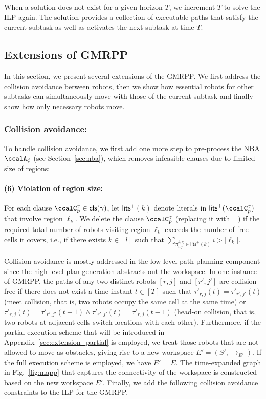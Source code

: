 \documentclass[Afour,sageh,times]{sagej}
\newcommand{\clause}[1]{\mathsf{cls}(#1)}
\newcommand{\cp}[2]{\ccalC_{#1}^{#2}}
\newcommand{\autop}{\ccalA_{\phi}}
\renewcommand{\ap}[3]{\mathcal{\pi}_{{#1},{#2}}^{#3}}
\begin{document}
{{When a solution does not exist for a given horizon $T$, we increment $T$ to solve the ILP again.  The solution provides  a collection of executable paths that satisfy  the current subtask   as well as activates the next subtask at time $T$.

\subsection{Extensions of GMRPP}\label{sec:extension_gmrpp}
In this section, we present several extensions of the GMRPP. We first address the collision avoidance between robots, then we  show  how essential robots for other subtasks can simultaneously move with those of the current subtask and finally show  how only necessary robots move.


\subsubsection{Collision avoidance:}\label{sec:extension_collision}
To handle collision avoidance, we first add one more step to  pre-process the NBA $\autop$ (see Section~\ref{sec:nba}), which removes infeasible clauses due to limited size of regions:
\paragraph{(6) Violation of region size:} \label{prune:violation2} For each clause $\cp{p}{\gamma} \in \clause{\gamma}$, let $\mathsf{lits}^+(k)$ denote literals in $\mathsf{lits}^+(\cp{p}{\gamma})$ that involve region $\ell_{k}$. We delete the clause $\cp{p}{\gamma}$ (replacing it with $\bot$) if the required total number of robots  visiting region $\ell_{k}$ exceeds the number of free cells it covers, i.e., if there exists $k\in[l]$ such that $ \sum_{\ap{i}{j}{k,\chi}\in\mathsf{lits}^+(k)}   i > |\ell_k|$.

Collision avoidance is mostly addressed in the low-level path planning component  since the high-level plan generation abstracts out the workspace. In one instance of GMRPP, the paths of  any two distinct robots $[r,j]$ and $[r', j']$ are collision-free if there does not exist  a time instant $t \in [T]$ such that $\tau'_{r,j}(t) = \tau'_{r',j'}(t)$ (meet collision, that is, two robots occupy the same cell at the same time) or  $\tau'_{r,j}(t) = \tau'_{r',j'}(t-1) \wedge \tau'_{r',j'}(t) = \tau'_{r,j}(t-1)$ (head-on collision, that is, two robots at adjacent cells switch locations with each other). Furthermore, if the partial execution scheme that will be introduced in Appendix~\ref{sec:extension_partial} is employed, we treat those robots that are not allowed to move  as obstacles, giving rise to a new workspace $E'=(S', \to_{E'})$. If the full execution scheme is employed, we have $E' = E$.
The time-expanded graph in Fig.~\ref{fig:mapp} that captures the connectivity of the workspace is constructed based on the new workspace $E'$. Finally, we add the following collision avoidance constraints to the ILP for the GMRPP.

}}
\end{document}

